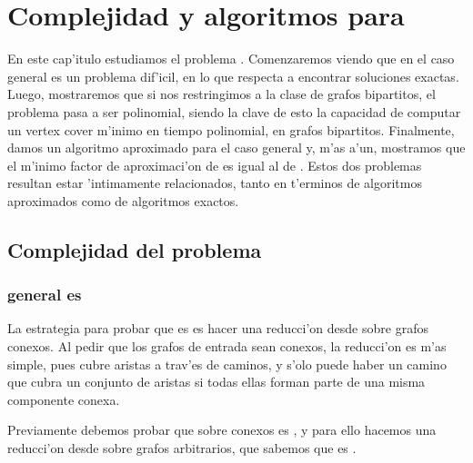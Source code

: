 \chapter{Complejidad y algoritmos para }
\label{ch:ss}

En este cap'itulo estudiamos el problema . Comenzaremos viendo que en el caso general es un problema dif'icil, en lo que respecta a encontrar soluciones exactas. Luego, mostraremos que si nos restringimos a la clase de grafos bipartitos, el problema pasa a ser polinomial, siendo la clave de esto la capacidad de computar un vertex cover m'inimo en tiempo polinomial, en grafos bipartitos. Finalmente, damos un algoritmo aproximado para el caso general y, m'as a'un, mostramos que el m'inimo factor de aproximaci'on de  es igual al de . Estos dos problemas resultan estar 'intimamente relacionados, tanto en t'erminos de algoritmos aproximados como de algoritmos exactos.

\section{Complejidad del problema}

\subsection{ general es }

La estrategia para probar que  es  es hacer una reducci'on desde  sobre grafos conexos. Al pedir que los grafos de entrada sean conexos, la reducci'on es m'as simple, pues  cubre aristas a trav'es de caminos, y s'olo puede haber un camino que cubra un conjunto de aristas si todas ellas forman parte de una misma componente conexa.

Previamente debemos probar que  sobre conexos es , y para ello hacemos una reducci'on desde  sobre grafos arbitrarios, que sabemos que es .

